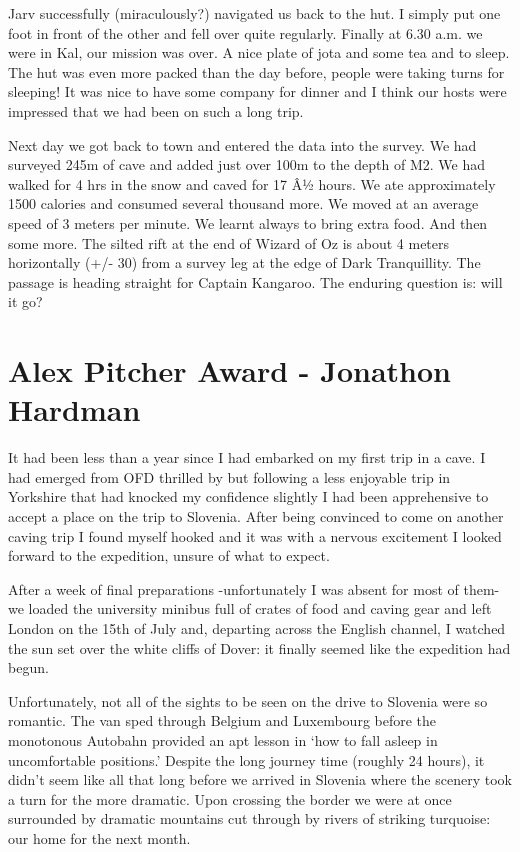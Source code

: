 Jarv successfully (miraculously?) navigated us back to the hut. I simply
put one foot in front of the other and fell over quite regularly.
Finally at 6.30 a.m. we were in Kal, our mission was over. A nice plate
of jota and some tea and to sleep. The hut was even more packed than the
day before, people were taking turns for sleeping! It was nice to have
some company for dinner and I think our hosts were impressed that we had
been on such a long trip.

Next day we got back to town and entered the data into the survey. We
had surveyed 245m of cave and added just over 100m to the depth of M2.
We had walked for 4 hrs in the snow and caved for 17 Â½ hours. We ate
approximately 1500 calories and consumed several thousand more. We moved
at an average speed of 3 meters per minute. We learnt always to bring
extra food. And then some more. The silted rift at the end of Wizard of
Oz is about 4 meters horizontally (+/- 30) from a survey leg at the edge
of Dark Tranquillity. The passage is heading straight for Captain
Kangaroo. The enduring question is: will it go?


\section{Alex Pitcher Award - Jonathon Hardman}

It had been less than a year since I had embarked on my first trip in a
cave. I had emerged from OFD thrilled by but following a less enjoyable
trip in Yorkshire that had knocked my confidence slightly I had been
apprehensive to accept a place on the trip to Slovenia. After being
convinced to come on another caving trip I found myself hooked and it
was with a nervous excitement I looked forward to the expedition, unsure
of what to expect.

After a week of final preparations -unfortunately I was absent for most
of them- we loaded the university minibus full of crates of food and
caving gear and left London on the 15th of July and, departing across
the English channel, I watched the sun set over the white cliffs of
Dover: it finally seemed like the expedition had begun.

Unfortunately, not all of the sights to be seen on the drive to Slovenia
were so romantic. The van sped through Belgium and Luxembourg before the
monotonous Autobahn provided an apt lesson in `how to fall asleep in
uncomfortable positions.' Despite the long journey time (roughly 24
hours), it didn't seem like all that long before we arrived in Slovenia
where the scenery took a turn for the more dramatic. Upon crossing the
border we were at once surrounded by dramatic mountains cut through by
rivers of striking turquoise: our home for the next month.

